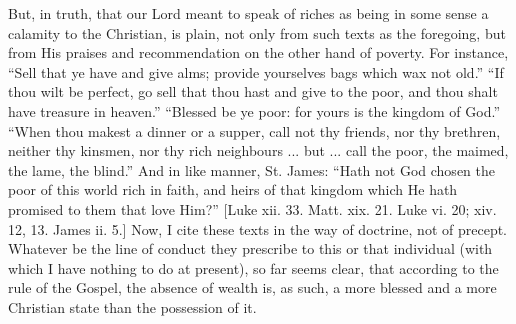 But, in truth, that our Lord meant to speak of riches as being in
some sense a calamity to the Christian, is plain, not only from such
texts as the foregoing, but from His praises and recommendation on the
other hand of poverty. For instance, ``Sell that ye have and give
alms; provide yourselves bags which wax not old.'' ``If thou
wilt be perfect, go sell that thou hast and give to the poor, and thou
shalt have treasure in heaven.'' ``Blessed be ye poor: for yours
is the kingdom of God.'' ``When thou makest a dinner or a
supper, call not thy friends, nor thy brethren, neither thy kinsmen, nor
thy rich neighbours ... but ... call the poor, the maimed, the lame, the
blind.'' And in like manner, St. James: ``Hath not God chosen
the poor of this world rich in faith, and heirs of that kingdom which He
hath promised to them that love Him?'' [Luke xii. 33. Matt. xix. 21.
Luke vi. 20; xiv. 12, 13. James ii. 5.] Now, I cite these texts in the
way of doctrine, not of precept. Whatever be the line of conduct they
prescribe to this or that individual (with which I have nothing to do at
present), so far seems clear, that according to the rule of the Gospel,
the absence of wealth is, as such, a more blessed and a more Christian
state than the possession of it.

